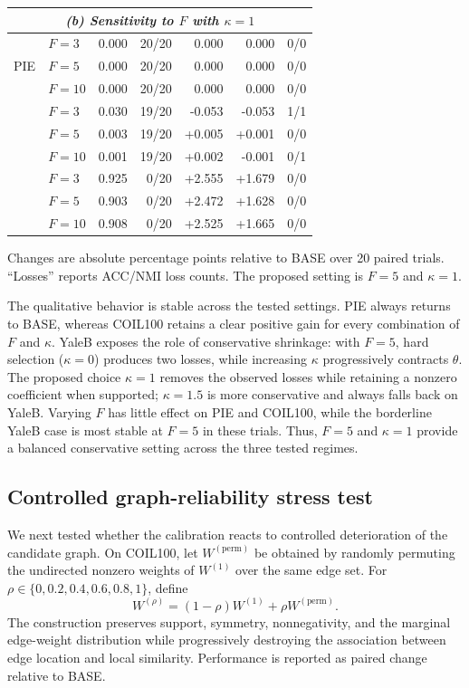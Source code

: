 \documentclass[11pt]{article}
\newenvironment{widetable}
  {\begin{strip}\centering\captionsetup{type=table}}
  {\end{strip}}
\theoremstyle{remark}
\begin{document}
\begin{widetable}
\begin{tabular}{llrrrrc}
\midrule
\multicolumn{7}{c}{\textit{(b) Sensitivity to $F$ with $\kappa=1$}} \\
\midrule
\multirow{3}{*}{PIE}
& $F=3$ & 0.000 & 20/20 & 0.000 & 0.000 & 0/0 \\
& $F=5$ & 0.000 & 20/20 & 0.000 & 0.000 & 0/0 \\
& $F=10$ & 0.000 & 20/20 & 0.000 & 0.000 & 0/0 \\
\addlinespace
\multirow{3}{*}{YaleB}
& $F=3$ & 0.030 & 19/20 & -0.053 & -0.053 & 1/1 \\
& $F=5$ & 0.003 & 19/20 & +0.005 & +0.001 & 0/0 \\
& $F=10$ & 0.001 & 19/20 & +0.002 & -0.001 & 0/1 \\
\addlinespace
\multirow{3}{*}{COIL100}
& $F=3$ & 0.925 & 0/20 & +2.555 & +1.679 & 0/0 \\
& $F=5$ & 0.903 & 0/20 & +2.472 & +1.628 & 0/0 \\
& $F=10$ & 0.908 & 0/20 & +2.525 & +1.665 & 0/0 \\
\bottomrule
\end{tabular}

\vspace{1mm}
\parbox{0.98\linewidth}{\footnotesize Changes are absolute percentage points relative to BASE over 20 paired trials. ``Losses'' reports ACC/NMI loss counts. The proposed setting is $F=5$ and $\kappa=1$.}
\end{widetable}

The qualitative behavior is stable across the tested settings. PIE always returns to BASE, whereas COIL100 retains a clear positive gain for every combination of $F$ and $\kappa$. YaleB exposes the role of conservative shrinkage: with $F=5$, hard selection ($\kappa=0$) produces two losses, while increasing $\kappa$ progressively contracts $\theta$. The proposed choice $\kappa=1$ removes the observed losses while retaining a nonzero coefficient when supported; $\kappa=1.5$ is more conservative and always falls back on YaleB. Varying $F$ has little effect on PIE and COIL100, while the borderline YaleB case is most stable at $F=5$ in these trials. Thus, $F=5$ and $\kappa=1$ provide a balanced conservative setting across the three tested regimes.
\subsection{Controlled graph-reliability stress test}

We next tested whether the calibration reacts to controlled deterioration of the candidate graph. On COIL100, let $W^{(\mathrm{perm})}$ be obtained by randomly permuting the undirected nonzero weights of $W^{(1)}$ over the same edge set. For $\rho\in\{0,0.2,0.4,0.6,0.8,1\}$, define
\[
W^{(\rho)}=(1-\rho)W^{(1)}+\rho W^{(\mathrm{perm})}.
\]
The construction preserves support, symmetry, nonnegativity, and the marginal edge-weight distribution while progressively destroying the association between edge location and local similarity. Performance is reported as paired change relative to BASE.
\end{document}
